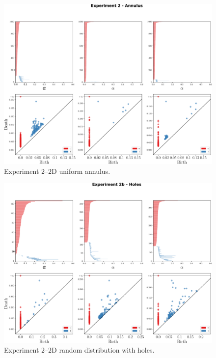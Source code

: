 \documentclass[10pt]{article}
\theoremstyle{definition}
\begin{document}
\begin{figure}[!htpb]
     \centering
     \includegraphics[width=\textwidth]{./figures/experiment-2-pd.pdf}
     \caption{Experiment $2$--$2$D uniform annulus.}%
     \label{Fig:persistence_exp2}
\end{figure}

\begin{figure}[!htpb]
     \centering
     \includegraphics[width=\textwidth]{./figures/experiment-2-bis-pd.pdf}
     \caption{Experiment $2$--$2$D random distribution with holes.}%
     \label{Fig:persistence_exp2b}
\end{figure}
\end{document}
